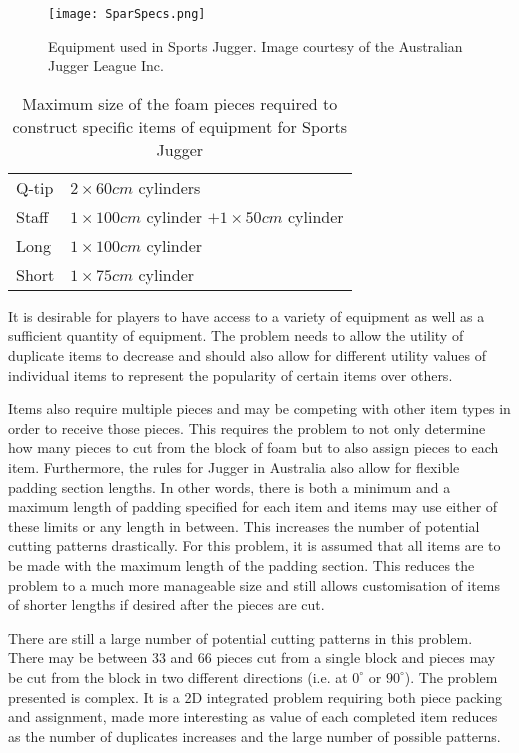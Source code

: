 \documentclass[10pt,a4paper]{article}
\begin{document}
\begin{figure}
\centering
\texttt{[image: SparSpecs.png]} 
\caption{Equipment used in Sports Jugger. Image courtesy of the Australian Jugger League Inc.}
\label{fig:spartypes}
\end{figure}

\begin{table}
\centering
\begin{tabular}{l|l}\hline
Q-tip & $2 \times 60cm$ cylinders\\
Staff & $1 \times 100cm$ cylinder $+ 1 \times 50cm$ cylinder\\
Long & $ 1 \times 100cm$ cylinder\\
Short & $1 \times 75cm$ cylinder\\\hline
\end{tabular}
\caption{Maximum size of the foam pieces required to construct specific items of equipment for Sports Jugger}
\label{tab:sparpieces}
\end{table}

\label{section:sparspecs}

It is desirable for players to have access to a variety of equipment as well as a sufficient quantity of equipment. The problem needs to allow the utility of duplicate items to decrease and should also allow for different utility values of individual items to represent the popularity of certain items over others. 

Items also require multiple pieces and may be competing with other item types in order to receive those pieces. This requires the problem to not only determine how many pieces to cut from the block of foam but to also assign pieces to each item. Furthermore, the rules for Jugger in Australia also allow for flexible padding section lengths. In other words, there is both a minimum and a maximum length of padding specified for each item and items may use either of these limits or any length in between. This increases the number of potential cutting patterns drastically. For this problem, it is assumed that all items are to be made with the maximum length of the padding section. This reduces the problem to a much more manageable size and still allows customisation of items of shorter lengths if desired after the pieces are cut.

There are still a large number of potential cutting patterns in this problem. There may be between 33 and 66 pieces cut from a single block and pieces may be cut from the block in two different directions (i.e. at $0^{\circ}$ or $90^{\circ}$).  The problem presented is complex. It is a 2D integrated problem requiring both piece packing and assignment, made more interesting as value of each completed item reduces as the number of duplicates increases and the large number of possible patterns.
\end{document}
